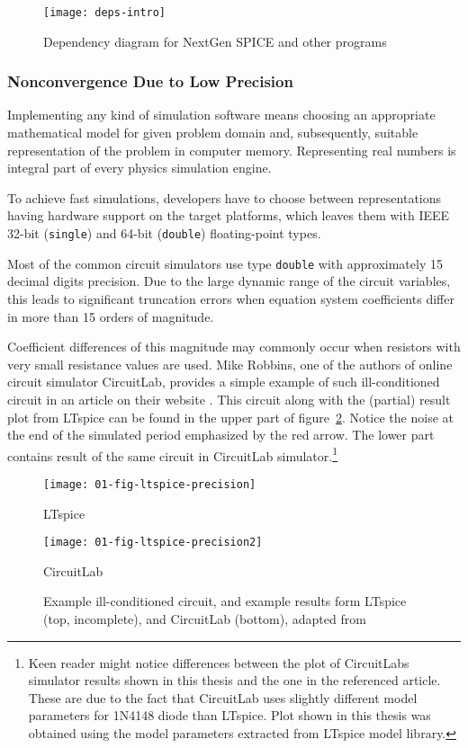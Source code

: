 \begin{figure}[h]
	\centering
	\texttt{[image: deps-intro]}
	\caption{Dependency diagram for NextGen SPICE and other programs}
	\label{fig:deps}
\end{figure}


\subsubsection*{Nonconvergence Due to Low Precision}
\label{chap:intro:dd}
Implementing any kind of simulation software means choosing an appropriate mathematical model for given problem domain and, subsequently, suitable representation of the problem in computer memory. Representing real numbers is integral part of every physics simulation engine.

To achieve fast simulations, developers have to choose between representations having hardware support on the target platforms, which leaves them with IEEE 32-bit (\texttt{single}) and 64-bit (\texttt{double}) floating-point types. 

Most of the common circuit simulators use type \texttt{double} with approximately 15 decimal digits precision. Due to the large dynamic range of the circuit variables, this leads to significant truncation errors when equation system coefficients differ in more than 15 orders of magnitude.

Coefficient differences of this magnitude may commonly occur when resistors with very small resistance values are used. Mike Robbins, one of the authors of online circuit simulator CircuitLab, provides a simple example of such ill-conditioned circuit in an article on their website \cite{circuitlab_dd}. This circuit along with the (partial) result plot from LTspice can be found in the upper part of figure~\ref{fig:ltspice-precision}. Notice the noise at the end of the simulated period emphasized by the red arrow. The lower part contains result of the same circuit in CircuitLab simulator.\footnote{Keen reader might notice differences between the plot of CircuitLabs simulator results shown in this thesis and the one in the referenced article. These are due to the fact that CircuitLab uses slightly different model parameters for 1N4148 diode than LTspice. Plot shown in this thesis was obtained using the model parameters extracted from LTspice model library.}

\begin{figure}[h]
	\centering
	\texttt{[image: 01-fig-ltspice-precision]}
	\caption*{LTspice}
	\texttt{[image: 01-fig-ltspice-precision2]}
	\caption*{CircuitLab}
	\caption{Example ill-conditioned circuit, and example results form LTspice (top, incomplete), and CircuitLab (bottom), adapted from \cite{circuitlab_dd}}
	\label{fig:ltspice-precision}
\end{figure}

